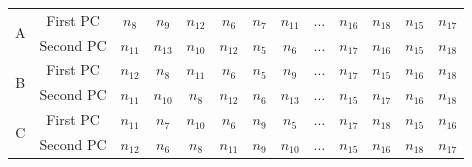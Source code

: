    
{\tiny 

  \begin{table}[!ht]
    \centering
    \begin{tabular}{|c|c|c|c|c|c|c|c|c|c|c|c|c|}
      \hline
      \multirow{2}{*}{A} & First PC & \cellcolor[gray]{0.7} $n_{8}$ & \cellcolor[gray]{0.7} $n_{9}$ & \cellcolor[gray]{0.7} $n_{12}$ & \cellcolor[gray]{0.6} $n_{6}$ & \cellcolor[gray]{0.7} $n_{7}$ & \cellcolor[gray]{0.7} $n_{11}$ & $\dots$ & \cellcolor[gray]{0.9} $ n_{16}$ & \cellcolor[gray]{0.9} $n_{18}$ & \cellcolor[gray]{0.9} $n_{15}$ & \cellcolor[gray]{0.9} $n_{17}$ \\ \cline{2-13}
      & Second PC & \cellcolor[gray]{0.7} $n_{11}$ & \cellcolor[gray]{0.8} $n_{13}$ & \cellcolor[gray]{0.7} $n_{10}$ & \cellcolor[gray]{0.7} $n_{12}$ & \cellcolor[gray]{0.6} $n_{5}$ & \cellcolor[gray]{0.6} $n_{6}$ & $\dots$ & \cellcolor[gray]{0.9}  $n_{17}$ & \cellcolor[gray]{0.9}  $n_{16}$ & \cellcolor[gray]{0.9}  $n_{15}$ & \cellcolor[gray]{0.9} $n_{18}$ \\
      \hline
      \cline{1-13}
      \multirow{2}{*}{B}& First PC & \cellcolor[gray]{0.7} $n_{12}$ & \cellcolor[gray]{0.7} $n_{8}$ & \cellcolor[gray]{0.7} $n_{11}$ & \cellcolor[gray]{0.6} $n_{6}$ & \cellcolor[gray]{0.6} $n_{5}$ & \cellcolor[gray]{0.7} $n_{9}$ & $\dots$ & \cellcolor[gray]{0.9}  $n_{17}$ & \cellcolor[gray]{0.9}  $n_{15}$ & \cellcolor[gray]{0.9}  $n_{16}$ & \cellcolor[gray]{0.9} $n_{18}$ \\ 
      \cline{2-13}
      & Second PC & \cellcolor[gray]{0.7} $n_{11}$ & \cellcolor[gray]{0.7} $n_{10}$ & \cellcolor[gray]{0.7} $n_{8}$ & \cellcolor[gray]{0.7} $n_{12}$ & \cellcolor[gray]{0.6} $n_{6}$ & \cellcolor[gray]{0.8} $n_{13}$ & $\dots$ &  \cellcolor[gray]{0.9} $n_{15}$ & \cellcolor[gray]{0.9}  $n_{17}$ & \cellcolor[gray]{0.9} $n_{16}$ & \cellcolor[gray]{0.9} $n_{18}$ \\ 
      \hline
      \cline{1-13}
      \multirow{2}{*}{C}& First PC & \cellcolor[gray]{0.7} $n_{11}$ & \cellcolor[gray]{0.7} $n_{7}$ & \cellcolor[gray]{0.7} $n_{10}$ & \cellcolor[gray]{0.6} $n_{6}$ & \cellcolor[gray]{0.7} $n_{9}$ & \cellcolor[gray]{0.6} $n_{5}$ & $\dots$ &  \cellcolor[gray]{0.9}  $n_{17}$ & \cellcolor[gray]{0.9} $n_{18}$ & \cellcolor[gray]{0.9} $n_{15}$ & \cellcolor[gray]{0.9} $n_{16}$ \\ 
      \cline{2-13}
      & Second PC & \cellcolor[gray]{0.7} $n_{12}$ & \cellcolor[gray]{0.6} $n_{6}$ & \cellcolor[gray]{0.7} $n_{8}$ & \cellcolor[gray]{0.7} $n_{11}$ & \cellcolor[gray]{0.7} $n_{9}$ & \cellcolor[gray]{0.7} $n_{10}$ & $\dots$ &  \cellcolor[gray]{0.9}  $n_{15}$ & \cellcolor[gray]{0.9} $n_{16}$ & \cellcolor[gray]{0.9} $n_{18}$ & \cellcolor[gray]{0.9} $n_{17}$ \\ 

\end{tabular}
\end{table}}
